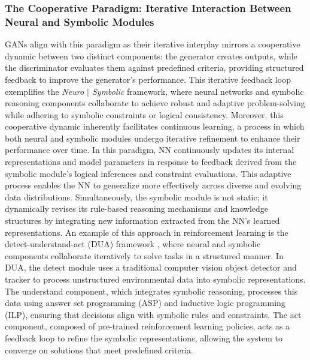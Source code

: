 \documentclass[12pt]{article}
\begin{document}
\subsubsection{The Cooperative Paradigm: Iterative Interaction Between Neural and Symbolic Modules}
GANs align with this paradigm as their iterative interplay mirrors a cooperative dynamic between two distinct components: the generator creates outputs, while the discriminator evaluates them against predefined criteria, providing structured feedback to improve the generator's performance. This iterative feedback loop exemplifies the \textit{Neuro $|$ Symbolic} framework, where neural networks and symbolic reasoning components collaborate to achieve robust and adaptive problem-solving while adhering to symbolic constraints or logical consistency. Moreover, this cooperative dynamic inherently facilitates continuous learning, a process in which both neural and symbolic modules undergo iterative refinement to enhance their performance over time. In this paradigm, NN continuously updates its internal representations and model parameters in response to feedback derived from the symbolic module’s logical inferences and constraint evaluations. This adaptive process enables the NN to generalize more effectively across diverse and evolving data distributions. Simultaneously, the symbolic module is not static; it dynamically revises its rule-based reasoning mechanisms and knowledge structures by integrating new information extracted from the NN’s learned representations.
An example of this approach in reinforcement learning is the detect-understand-act (DUA) framework \cite{mitchener2022detect}, where neural and symbolic components collaborate iteratively to solve tasks in a structured manner. In DUA, the detect module uses a traditional computer vision object detector and tracker to process unstructured environmental data into symbolic representations. The understand component, which integrates symbolic reasoning, processes this data using answer set programming (ASP) and inductive logic programming (ILP), ensuring that decisions align with symbolic rules and constraints. The act component, composed of pre-trained reinforcement learning policies, acts as a feedback loop to refine the symbolic representations, allowing the system to converge on solutions that meet predefined criteria.
\end{document}
